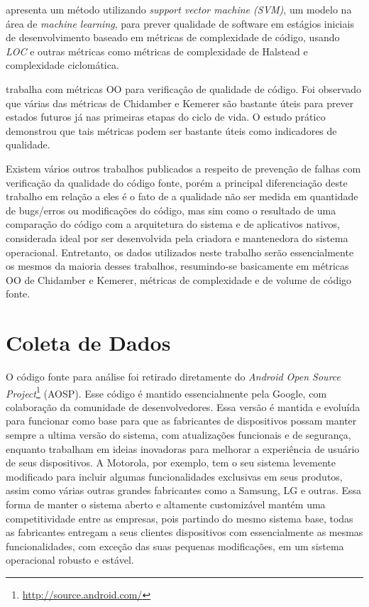  apresenta um método utilizando \textit{support vector machine (SVM)}, um modelo na área de \textit{machine learning}, para prever qualidade de software em estágios iniciais de desenvolvimento baseado em métricas de complexidade de código, usando \textit{LOC} e outras métricas como métricas de complexidade de Halstead e complexidade ciclomática.

 trabalha com métricas OO para verificação de qualidade de código. Foi observado que várias das métricas de Chidamber e Kemerer são bastante úteis para prever estados futuros já nas primeiras etapas do ciclo de vida. O estudo prático demonstrou que tais métricas podem ser bastante úteis como indicadores de qualidade.

Existem vários outros trabalhos publicados a respeito de prevenção de falhas com verificação da qualidade do código fonte, porém a principal diferenciação deste trabalho em relação a eles é o fato de a qualidade não ser medida em quantidade de bugs/erros ou modificações do código, mas sim como o resultado de uma comparação do código com a arquitetura do sistema e de aplicativos nativos, considerada ideal por ser desenvolvida pela criadora e mantenedora do sistema operacional. Entretanto, os dados utilizados neste trabalho serão essencialmente os mesmos da maioria desses trabalhos, resumindo-se basicamente em métricas OO de Chidamber e Kemerer, métricas de complexidade e de volume de código fonte.

\section{Coleta de Dados}

O código fonte para análise foi retirado diretamente do \textit{Android Open Source Project}\footnote{\url{http://source.android.com/}}  (AOSP). Esse código é mantido essencialmente pela Google, com colaboração da comunidade de desenvolvedores. Essa versão é mantida e evoluída para funcionar como base para que as fabricantes de dispositivos possam manter sempre a ultima versão do sistema, com atualizações funcionais e de segurança, enquanto trabalham em ideias inovadoras para melhorar a experiência de usuário de seus dispositivos. A Motorola, por exemplo, tem o seu sistema levemente modificado para incluir algumas funcionalidades exclusivas em seus produtos, assim como várias outras grandes fabricantes como a Samsung, LG e outras.  Essa forma de manter o sistema aberto e altamente customizável mantém uma competitividade entre as empresas, pois partindo do mesmo sistema base, todas as fabricantes entregam a seus clientes dispositivos com essencialmente as mesmas funcionalidades, com exceção das suas pequenas modificações, em um sistema operacional robusto e estável.

